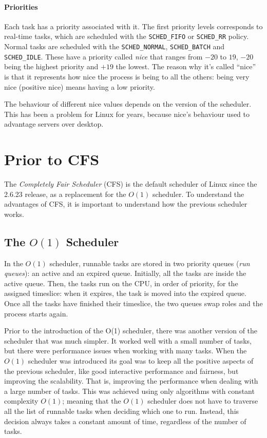 \paragraph{Priorities} %
Each task has a priority associated with it. The first priority levels
corresponds to real-time tasks, which are scheduled with the
\verb|SCHED_FIFO| or \verb|SCHED_RR| policy. Normal tasks are
scheduled with the \verb|SCHED_NORMAL|, \verb|SCHED_BATCH| and
\verb|SCHED_IDLE|. These have a priority called \textit{nice} that ranges
from $-20$ to $19$, $-20$ being the highest priority and $+19$ the
lowest. The reason why it's called ``nice'' is that it represents how nice the process is being to all the others: being very nice (positive nice) means having a low priority.

The behaviour of different nice values depends on the version
of the scheduler. This has been a problem for Linux for years, because nice's behaviour used to advantage servers over desktop\cite{nice_design}.

\label{sec:cfs}
\section{Prior to CFS}
The \textit{Completely Fair Scheduler} (CFS) is the default scheduler of Linux since the 2.6.23 release, as a replacement for the $O(1)$ scheduler. To understand the advantages of CFS, it is important to understand how the previous scheduler works.

\subsection{The $O(1)$ Scheduler}
In the $O(1)$ scheduler, runnable tasks are stored in two priority queues (\textit{run queues}): an active and an expired queue. Initially, all the tasks are inside the active queue. Then, the tasks run on the CPU, in order of priority, for the assigned timeslice: when it expires, the task is moved into the expired queue. Once all the tasks have finished their timeslice, the two queues swap roles and the process starts again.

Prior to the introduction of the O(1) scheduler, there was another version of the scheduler that was much simpler. It worked well with a small number of tasks, but there were performance issues when working with many tasks. When the $O(1)$ scheduler was introduced its goal was to keep all the positive aspects of the previous scheduler, like good interactive performance and fairness, but improving the scalability. That is, improving the performance when dealing with a large number of tasks.
This was achieved using only algorithms with constant complexity $O(1)$; meaning that the $O(1)$ scheduler does not have to traverse all the list of runnable tasks when deciding which one to run. Instead, this decision always takes a constant amount of time, regardless of the number of tasks.

